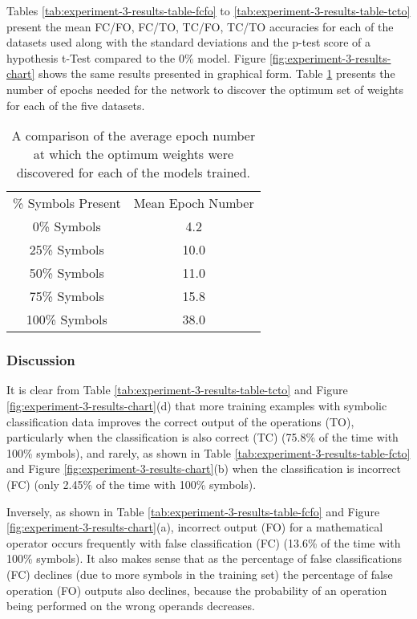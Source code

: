Tables \ref{tab:experiment-3-results-table-fcfo} to \ref{tab:experiment-3-results-table-tcto} present the mean FC/FO, FC/TO, TC/FO, TC/TO accuracies for each of the datasets used along with the standard deviations and the p-test score of a hypothesis t-Test compared to the 0\% model. Figure \ref{fig:experiment-3-results-chart} shows the same results presented in graphical form. Table \ref{tab:experiment-3-results-epochs} presents the number of epochs needed for the network to discover the optimum set of weights for each of the five datasets.

\begin{table}[h]
	\center
	\caption{A comparison of the average epoch number at which the optimum weights were discovered for each of the models trained.}
	\label{tab:experiment-3-results-epochs}
	\begin{tabular}{ |c|c| } 
		\hline
		\% Symbols Present & Mean Epoch Number\\ 
		0\% Symbols & 4.2\\  
		25\% Symbols & 10.0\\  
		50\% Symbols & 11.0\\  
		75\% Symbols & 15.8\\  
		100\% Symbols & 38.0\\  
		\hline
	\end{tabular}
\end{table}

\subsubsection{Discussion}

It is clear from Table \ref{tab:experiment-3-results-table-tcto} and Figure \ref{fig:experiment-3-results-chart}(d) that more training examples with symbolic classification data improves the correct output of the operations (TO), particularly when the classification is also correct (TC) (75.8\% of the time with 100\% symbols), and rarely, as shown in Table \ref{tab:experiment-3-results-table-fcto} and Figure \ref{fig:experiment-3-results-chart}(b) when the classification is incorrect (FC) (only 2.45\% of the time with 100\% symbols).

Inversely, as shown in Table \ref{tab:experiment-3-results-table-fcfo} and Figure \ref{fig:experiment-3-results-chart}(a), incorrect output (FO) for a mathematical operator occurs frequently with false classification (FC) (13.6\% of the time with 100\% symbols). It also makes sense that as the percentage of false classifications (FC) declines (due to more symbols in the training set) the percentage of false operation (FO) outputs also declines, because the probability of an operation being performed on the wrong operands decreases.

